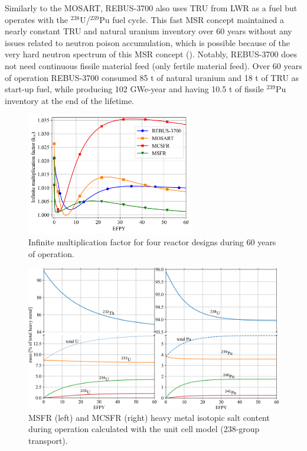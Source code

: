 \documentclass[letterpaper]{mandc2019}
\begin{document}
Similarly to the \gls{MOSART}, REBUS-3700 also uses TRU from \gls{LWR} as a fuel but operates with the $^{238}$U/$^{239}$Pu fuel cycle. 
This fast \gls{MSR} concept maintained a nearly constant TRU and natural uranium inventory over 60 years without any issues related to neutron poison accumulation, which is possible because of the very hard neutron spectrum of this \gls{MSR} concept (). 
Notably, REBUS-3700 does not need continuous fissile material feed (only fertile material feed). Over 60 years of operation REBUS-3700 consumed 85 t of natural uranium and 18 t of TRU as start-up fuel, while producing 102 GWe-year and having 10.5 t of fissile $^{239}$Pu inventory at the end of the lifetime. 
\begin{figure}[t!]
  \centering
  \vspace{-0.3in}
  \includegraphics[width=0.65\textwidth]{./Figures/k_inf.png}
	  \vspace{-0.15in}
  \caption{Infinite multiplication factor for four reactor designs during 60 years of operation.}
  \label{fig:k_inf}
\end{figure}
\begin{figure}[t!]
  \centering
  \includegraphics[width=\textwidth]{./Figures/msfr_mcsfr_balance.png}
	  \vspace{-0.2in}
  \caption{\gls{MSFR} (left) and \gls{MCSFR} (right) heavy metal isotopic salt content during operation calculated with the unit cell model (238-group transport).}
  \label{fig:msfr-u-balance}
\end{figure}
\end{document}
